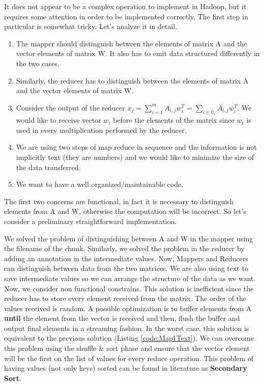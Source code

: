 \documentclass[a4paper,12pt]{article}
\begin{document}
It does not appear to be a complex operation to implement in Hadoop, but it requires some attention in order to be implemented correctly.
The first step in particular is somewhat tricky. 
Let's analyze it in detail.
\begin{enumerate}
\item The mapper should distinguish between the elements of matrix A and the vector elements of matrix W. 
It also has to emit data structured differently in the two cases.
\item Similarly, the reducer has to distinguish between the elements  of matrix A and the vector elements of matrix W.
\item Consider the output of the reducer $ x_j = \sum_{i=1}^{m} A_{i,j} w_{i}^{T} = \sum_{i \in \mathbb{O}_i} A_{i,j} w_{i}^{T}$.
 We would like to receive vector $w_i$ before the elements of the matrix since $w_i$ is used in every multiplication performed by the reducer.
\item We are using two steps of map reduce in sequence and the information is not implicitly text (they are numbers) and we would like to minimize the size of the data transferred.
\item We want to have a well organized/maintainable code.
\end{enumerate}

\FloatBarrier
The first two concerns are functional, in fact it is necessary to distinguish elements from A and W, otherwise the computation will be incorrect.
So let's consider a preliminary straightforward implementation.

We solved the problem of distinguishing between A and W in the mapper using the filename of the chunk. 
Similarly, we solved the problem in the reducer by adding an annotation in the intermediate values. 
Now, Mappers and Reducers can distinguish between data from the two matrices.
We are also using text to save intermediate values so we can arrange the structure of the data as we want.
Now, we consider non functional constrains.
This solution is inefficient since the reducer has to store every element received from the matrix. 
The order of the values received is random.
A possible optimization is to buffer elements from A \textbf{until} the element from the vector is received and then, flush the buffer and output final elements in a streaming fashion.
In the worst case, this solution is equivalent to the previous solution (Listing \ref{code:Map1Text}).
We can overcome this problem using the shuffle \& sort phase and ensure that the vector element will be the first on the list of values for every reduce operation.
This problem of having values (not only keys) sorted can be found in literature as \textbf{Secondary Sort}.
\end{document}
